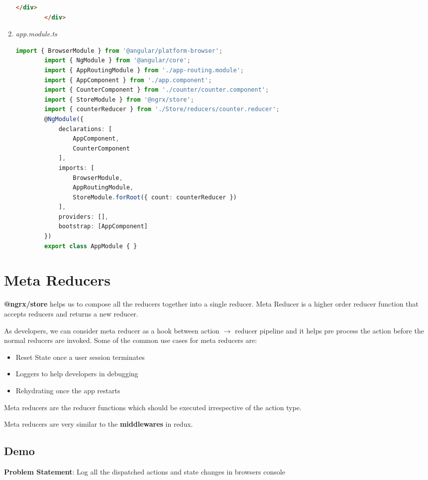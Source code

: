 \documentclass{report}
\begin{document}
\begin{enumerate}
\begin{lstlisting}[language=HTML, caption=counter.component.html]
			</div>
		</div>
\end{lstlisting}
\item{\textit{app.module.ts}}
	\begin{lstlisting}[language=Typescript, caption=app.module.ts]
		import { BrowserModule } from '@angular/platform-browser';
		import { NgModule } from '@angular/core';
		import { AppRoutingModule } from './app-routing.module';
		import { AppComponent } from './app.component';
		import { CounterComponent } from './counter/counter.component';
		import { StoreModule } from '@ngrx/store';
		import { counterReducer } from './Store/reducers/counter.reducer';
		@NgModule({
			declarations: [
				AppComponent,
				CounterComponent
			],
			imports: [
				BrowserModule,
				AppRoutingModule,
				StoreModule.forRoot({ count: counterReducer })
			],
			providers: [],
			bootstrap: [AppComponent]
		})
		export class AppModule { }
\end{lstlisting}
\end{enumerate}

\section{Meta Reducers}
\textbf{@ngrx/store} helps us to compose all the reducers together into a single reducer. Meta Reducer is a higher order reducer function that accepts reducers and returns a new reducer.

As developers, we can consider meta reducer as a hook between action $\rightarrow$ reducer pipeline and it helps pre process the action before the normal reducers are invoked.
Some of the common use cases for meta reducers are:
\begin{itemize}
	\item{Reset State once a user session terminates}
	\item{Loggers to help developers in debugging}
	\item{Rehydrating once the app restarts}
\end{itemize}

Meta reducers are the reducer functions which should be executed irrespective of the action type.

Meta reducers are very similar to the \textbf{middlewares} in redux.
\subsection{Demo}
\textbf{Problem Statement}: Log all the dispatched actions and state changes in browsers console
\end{document}
